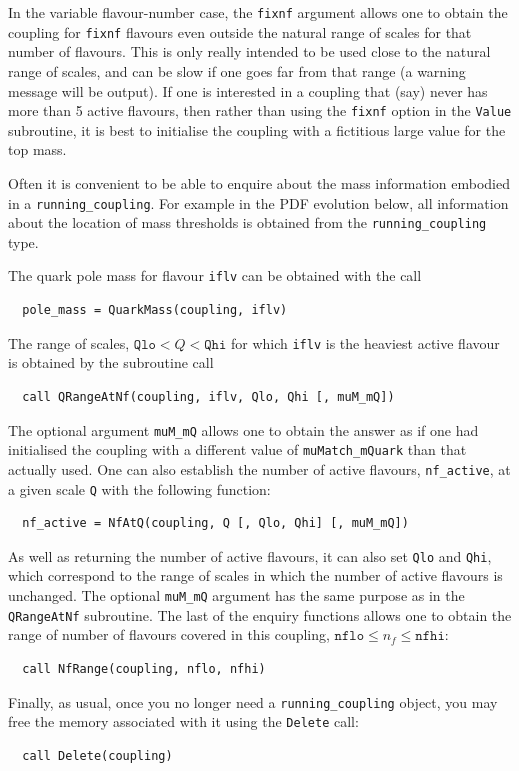 \documentclass[12pt]{article}
\newcommand{\ttt}[1]{\texttt{#1}}
\begin{document}
In the variable flavour-number case, the \ttt{fixnf} argument allows
one to obtain the coupling for \ttt{fixnf} flavours even outside the
natural range of scales for that number of flavours. This is only
really intended to be used close to the natural range of scales, and
can be slow if one goes far from that range (a warning message will be
output). If one is interested in a coupling that (say) never has more
than 5 active flavours, then rather than using the \ttt{fixnf} option
in the \ttt{Value} subroutine, it is best to initialise the coupling
with a fictitious large value for the top mass.

Often it is convenient to be able to enquire about the mass information
embodied in a \ttt{running\_coupling}. For example in the PDF
evolution below, all information about the location of mass thresholds is
obtained from the \ttt{running\_coupling} type.

The quark pole mass for flavour \ttt{iflv} can be obtained with the
call
\begin{lstlisting}
  pole_mass = QuarkMass(coupling, iflv)
\end{lstlisting}
The range of scales, $\ttt{Qlo} < Q < \ttt{Qhi}$ for which \ttt{iflv}
is the heaviest active flavour is obtained by the subroutine call
\begin{lstlisting}
  call QRangeAtNf(coupling, iflv, Qlo, Qhi [, muM_mQ])
\end{lstlisting}
The optional argument \ttt{muM\_mQ} allows one to obtain the answer as
if one had initialised the coupling with a different value of
\ttt{muMatch\_mQuark} than that actually used. One can also establish
the number of active flavours, \ttt{nf\_active}, at a given scale
\ttt{Q} with the following function:
\begin{lstlisting}
  nf_active = NfAtQ(coupling, Q [, Qlo, Qhi] [, muM_mQ])
\end{lstlisting}
As well as returning the number of active flavours, it can also set
\ttt{Qlo} and \ttt{Qhi}, which correspond to the range of scales in
which the number of active flavours is unchanged. The optional
\ttt{muM\_mQ} argument has the same purpose as in the \ttt{QRangeAtNf}
subroutine. The last of the enquiry functions allows one to obtain the
range of number of flavours covered in this coupling, $\ttt{nflo} \le
n_f \le \ttt{nfhi}$:
\begin{lstlisting}
  call NfRange(coupling, nflo, nfhi)
\end{lstlisting}

Finally, as usual, once you no longer need a \ttt{running\_coupling}
object, you may free the memory associated with it using the
\ttt{Delete} call:
\begin{lstlisting}
  call Delete(coupling)
\end{lstlisting}
\end{document}
